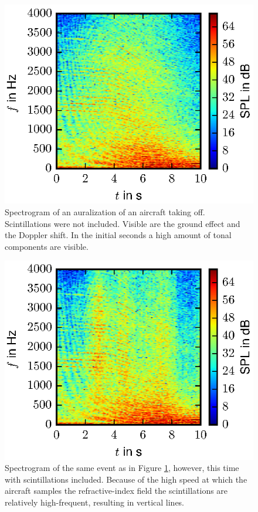 \begin{figure}[H]
  \centering
  \includegraphics[]{../figures/manual/turbulence-model/auralisation_flight_without}
  \caption{Spectrogram of an auralization of an aircraft taking off.
Scintillations were not included. Visible are the ground effect and the Doppler
shift. In the initial seconds a high amount of tonal components are visible.
  }
  \label{fig:results_auralization_without}
\end{figure}

\begin{figure}[H]
  \centering
  \includegraphics[]{../figures/manual/turbulence-model/auralisation_flight_both}
  \caption{Spectrogram of the same event as in Figure
  \ref{fig:results_auralization_without}, however, this time with scintillations included. Because of the high speed at which the aircraft samples the refractive-index field the scintillations are relatively high-frequent, resulting in vertical lines.}
  \label{fig:results_auralization_with}
\end{figure}


